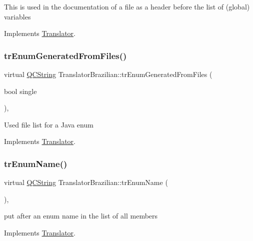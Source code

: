 This is used in the documentation of a file as a header before the list of (global) variables 

Implements \mbox{\hyperlink{class_translator}{Translator}}.

\mbox{\label{class_translator_brazilian_af7ae82caa6c7afffaed7aed1d051c3db}} 
\subsubsection{\texorpdfstring{trEnumGeneratedFromFiles()}{trEnumGeneratedFromFiles()}}
{\footnotesize\ttfamily virtual \mbox{\hyperlink{class_q_c_string}{Q\+C\+String}} Translator\+Brazilian\+::tr\+Enum\+Generated\+From\+Files (\begin{DoxyParamCaption}\item[{bool}]{single }\end{DoxyParamCaption})\hspace{0.3cm}{\ttfamily [inline]}, {\ttfamily [virtual]}}

Used file list for a Java enum 

Implements \mbox{\hyperlink{class_translator}{Translator}}.

\mbox{\label{class_translator_brazilian_a2c83f1b8edade3b2a856d7ee210b233b}} 
\subsubsection{\texorpdfstring{trEnumName()}{trEnumName()}}
{\footnotesize\ttfamily virtual \mbox{\hyperlink{class_q_c_string}{Q\+C\+String}} Translator\+Brazilian\+::tr\+Enum\+Name (\begin{DoxyParamCaption}{ }\end{DoxyParamCaption})\hspace{0.3cm}{\ttfamily [inline]}, {\ttfamily [virtual]}}

put after an enum name in the list of all members 

Implements \mbox{\hyperlink{class_translator}{Translator}}.

\mbox{\label{class_translator_brazilian_af0692614b98ea9e91622140461e4bbec}} 
